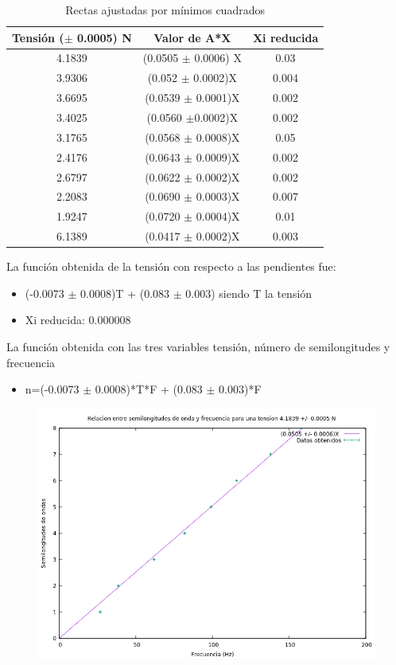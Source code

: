 \documentclass[10pt,a4paper]{article}
\begin{document}
\begin{table}[H]
\centering
    \begin{tabular}{|c|c|c|}
    \hline
    Tensión ($\pm$ 0.0005) N & Valor de A*X & Xi reducida \\\hline
    4.1839 & (0.0505 $\pm$ 0.0006) X & 0.03 \\\hline
    3.9306& (0.052 $\pm$ 0.0002)X & 0.004 \\\hline
    3.6695& (0.0539 $\pm$ 0.0001)X & 0.002 \\\hline
    3.4025& (0.0560 $\pm$0.0002)X & 0.002\\\hline
    3.1765& (0.0568 $\pm$ 0.0008)X & 0.05\\\hline
    2.4176& (0.0643 $\pm$ 0.0009)X & 0.002\\\hline
    2.6797& (0.0622 $\pm$ 0.0002)X & 0.002\\\hline
    2.2083& (0.0690 $\pm$ 0.0003)X & 0.007\\\hline
    1.9247& (0.0720 $\pm$ 0.0004)X & 0.01\\\hline
    6.1389& (0.0417 $\pm$ 0.0002)X & 0.003\\\hline
    \end{tabular}
    \caption{Rectas ajustadas por mínimos cuadrados}
    \label{tab:my_label}
    \end{table}
    
    La función obtenida de la tensión con respecto a las pendientes  fue:
    \begin{itemize}
        \item (-0.0073 $\pm$ 0.0008)T + (0.083 $\pm$ 0.003) siendo T la tensión
        \item Xi reducida: 0.000008
    \end{itemize}
    La función obtenida con las tres variables tensión, número de semilongitudes y frecuencia 
    \begin{itemize}
        \item n=(-0.0073 $\pm$ 0.0008)*T*F + (0.083 $\pm$ 0.003)*F
    \end{itemize}
\begin{figure}[H]
\includegraphics[scale=0.65]{1.png}
\centering
\end{figure}
\end{document}
